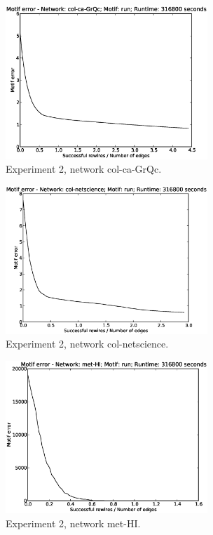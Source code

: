 \begin{figure}[p]
\centering
\includegraphics[width=3in]{Figures/motif_error-col-ca-GrQc-run.eps}
\caption{Experiment 2, network col-ca-GrQc.}
\label{fig:exp2-col-ca-GrQc-run}
\end{figure}

\begin{figure}[p]
\centering
\includegraphics[width=3in]{Figures/motif_error-col-netscience-run.eps}
\caption{Experiment 2, network col-netscience.}
\label{fig:exp2-col-netscience-run}
\end{figure}

\begin{figure}[p]
\centering
\includegraphics[width=3in]{Figures/motif_error-met-HI-run.eps}
\caption{Experiment 2, network met-HI.}
\label{fig:exp2-met-HI-run}
\end{figure}

